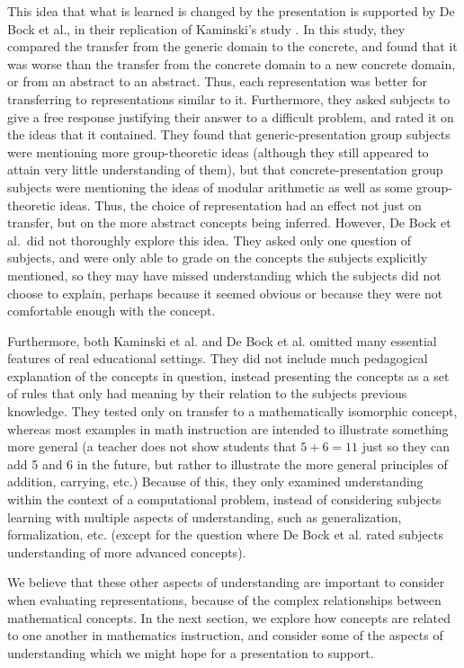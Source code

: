 \documentclass[man,10pt]{apa6}
\begin{document}
This idea that what is learned is changed by the presentation is supported by De Bock et al., in their replication of Kaminski's study \cite{DeBock2011}. In this study, they compared the transfer from the generic domain to the concrete, and found that it was worse than the transfer from the concrete domain to a new concrete domain, or from an abstract to an abstract. Thus, each representation was better for transferring to representations similar to it. Furthermore, they asked subjects to give a free response justifying their answer to a difficult problem, and rated it on the ideas that it contained. They found that generic-presentation group subjects were mentioning more group-theoretic ideas (although they still appeared to attain very little understanding of them), but that concrete-presentation group subjects were mentioning the ideas of modular arithmetic as well as some group-theoretic ideas. Thus, the choice of representation had an effect not just on transfer, but on the more abstract concepts being inferred. However, De Bock et al.\ did not thoroughly explore this idea. They asked only one question of subjects, and were only able to grade on the concepts the subjects explicitly mentioned, so they may have missed understanding which the subjects did not choose to explain, perhaps because it seemed obvious or because they were not comfortable enough with the concept.\par
Furthermore, both Kaminski et al. and De Bock et al. omitted many essential features of real educational settings. They did not include much pedagogical explanation of the concepts in question, instead presenting the concepts as a set of rules that only had meaning by their relation to the subjects previous knowledge. They tested only on transfer to a mathematically isomorphic concept, whereas most examples in math instruction are intended to illustrate something more general (a teacher does not show students that $5+6 = 11$ just so they can add 5 and 6 in the future, but rather to illustrate the more general principles of addition, carrying, etc.) Because of this, they only examined understanding within the context of a computational problem, instead of considering subjects learning with multiple aspects of understanding, such as generalization, formalization, etc. (except for the question where De Bock et al. rated subjects understanding of more advanced concepts).\par
We believe that these other aspects of understanding are important to consider when evaluating representations, because of the complex relationships between mathematical concepts. In the next section, we explore how concepts are related to one another in mathematics instruction, and consider some of the aspects of understanding which we might hope for a presentation to support. 
\end{document}
